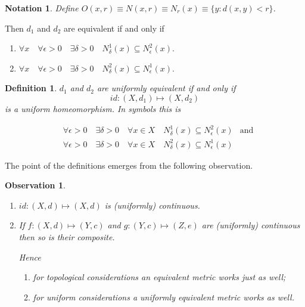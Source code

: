 \documentclass{notes}
\theoremstyle{plain}
\newtheorem{observation}[proposition]{Observation}
\newtheorem{definition}[proposition]{Definition}
\newtheorem*{notation}{Notation}
\newcommand{\Forall}[1]{\forall #1 \quad}
\newcommand{\Exists}[1]{\exists #1 \quad}
\begin{document}
\begin{notation}
Define $O(x,r) \equiv N(x,r) \equiv N_r(x) \equiv \{y\colon d(x,y)<r\}$.
\end{notation}

Then $ d_{1} $ and $ d_{2} $ are equivalent if and only if
\begin{enumerate}
\item $ \Forall{x} \Forall{\epsilon>0} \Exists{\delta>0} 
N^{1}_{\delta}(x) \subseteq N_{\epsilon}^{2}(x) $.
\item $ \Forall{x} \Forall{\epsilon>0} \Exists{\delta>0} 
N^{2}_{\delta}(x) \subseteq N_{\epsilon}^{1}(x) $.
\end{enumerate}

\begin{definition}
$ d_{1} $ and $ d_{2} $ are \emph{uniformly equivalent} if and only if
\[
id\colon (X,d_{1}) \mapsto (X,d_{2})
\] is a uniform homeomorphism.
In symbols this is

\begin{align*}
&\Forall{\epsilon>0} \Exists{\delta>0} \Forall{x \in X} 
N^{1}_{\delta}(x) \subseteq N_{\epsilon}^{2}(x) & \text{and} \\
&\Forall{\epsilon>0} \Exists{\delta>0} \Forall{x \in X} 
N^{2}_{\delta}(x) \subseteq N_{\epsilon}^{1}(x)
\end{align*}
\end{definition}

The point of the definitions emerges from the following observation.

\begin{observation}
\

\begin{enumerate}
\item $ id\colon (X,d) \mapsto (X,d) $ is (uniformly) continuous.
\item If $ f\colon (X,d) \mapsto (Y,c) $ and $ g\colon (Y,c) \mapsto 
(Z,e) $ are (uniformly) continuous then so is their composite.

Hence
\begin{enumerate}
\item for topological considerations an equivalent metric works just 
as well;
\item for uniform considerations a uniformly equivalent metric works 
as well.
\end{enumerate}
\end{enumerate}
\end{observation}
\end{document}

